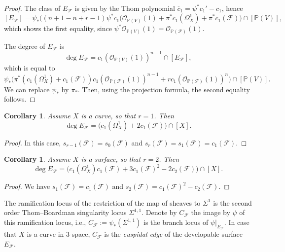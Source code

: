 \documentclass[reqno]{amsart}
\newtheorem{cor}[lemma]{Corollary}
\theoremstyle{definition}
\theoremstyle{remark}
\begin{document}
\begin{proof}
The class of $E_\mathcal F$ is given by the Thom polynomial $\overline c_1=\psi^*c_1'-c_1$, hence
\[ [E_\mathcal F]=\psi_*\bigl((n+1-n+r-1)\psi^*c_1(\mathcal O_{\mathbb P(V)}(1)+\pi^*c_1(\Omega^1_X)+\pi^*c_1(\mathcal F)\bigr)\cap [\mathbb P(V)],\]
which shows the first equality, since $\psi^*\mathcal O_{\mathbb P(V)}(1)=\mathcal O_{\mathbb P(\mathcal F)}(1)$.

The degree of $E_\mathcal F$ is
\[\deg E_\mathcal F=c_1(\mathcal O_{\mathbb P(V)}(1))^{n-1} \cap [E_\mathcal F],\]
which is equal to
\[\psi_*\bigl(\pi^*(c_1(\Omega^1_X)+c_1(\mathcal F))c_1(\mathcal O_{\mathbb P(\mathcal F)}(1))^{n-1}+rc_1(\mathcal O_{\mathbb P(\mathcal F)}(1))^n\bigr)\cap [\mathbb P(V)].\]
We can replace $\psi_*$ by $\pi_*$. Then, using the projection formula,
 the second equality follows.
\end{proof}

\begin{cor}\label{envcurve}
Assume $X$ is a curve, so that $r=1$. Then
\[\deg E_\mathcal F =\bigl(c_1(\Omega_X^1)+2c_1(\mathcal F)\bigr)\cap [X].\]
\end{cor}

\begin{proof}
In this case, $s_{r-1}(\mathcal F)=s_0(\mathcal F)$ and $s_r(\mathcal F)=s_1(\mathcal F)=c_1(\mathcal F)$.
\end{proof}

\begin{cor}\label{envsurf}
Assume $X$ is a surface, so that $r=2$. Then
\[\deg E_\mathcal F =\bigl(c_1(\Omega_X^1)c_1(\mathcal F)+3c_1(\mathcal F)^2-2c_2(\mathcal F)\bigr)\cap [X] .\]
\end{cor} 

\begin{proof}
We have $s_1(\mathcal F)=c_1(\mathcal F)$ and $s_2(\mathcal F)=c_1(\mathcal F)^2-c_2(\mathcal F)$.
\end{proof}
\medskip

The ramification locus of the restriction of the map of sheaves to $\Sigma^1$ is the second order Thom--Boardman singularity locus $\Sigma^{1,1}$. Denote by $C_\mathcal F$ the image by $\psi$ of this ramification locus, i.e., $C_\mathcal F:=\psi_*(\Sigma^{1,1})$ is the branch locus of $\psi|_{E_{\mathcal F}}$. In case that $X$ is a curve in 3-space, $C_\mathcal F$ is the \emph{cuspidal edge} of the developable  surface $E_{\mathcal F}$.
\end{document}
